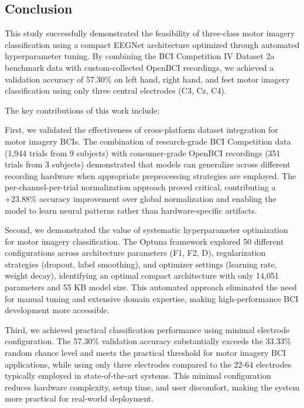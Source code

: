 \subsection{Conclusion}

This study successfully demonstrated the feasibility of three-class motor imagery classification using a compact EEGNet architecture optimized through automated hyperparameter tuning. By combining the BCI Competition IV Dataset 2a benchmark data with custom-collected OpenBCI recordings, we achieved a validation accuracy of 57.30\% on left hand, right hand, and feet motor imagery classification using only three central electrodes (C3, Cz, C4).

The key contributions of this work include:

First, we validated the effectiveness of cross-platform dataset integration for motor imagery BCIs. The combination of research-grade BCI Competition data (1,944 trials from 9 subjects) with consumer-grade OpenBCI recordings (351 trials from 3 subjects) demonstrated that models can generalize across different recording hardware when appropriate preprocessing strategies are employed. The per-channel-per-trial normalization approach proved critical, contributing a +23.88\% accuracy improvement over global normalization and enabling the model to learn neural patterns rather than hardware-specific artifacts.

Second, we demonstrated the value of systematic hyperparameter optimization for motor imagery classification. The Optuna framework explored 50 different configurations across architecture parameters (F1, F2, D), regularization strategies (dropout, label smoothing), and optimizer settings (learning rate, weight decay), identifying an optimal compact architecture with only 14,051 parameters and 55 KB model size. This automated approach eliminated the need for manual tuning and extensive domain expertise, making high-performance BCI development more accessible.

Third, we achieved practical classification performance using minimal electrode configuration. The 57.30\% validation accuracy substantially exceeds the 33.33\% random chance level and meets the practical threshold for motor imagery BCI applications, while using only three electrodes compared to the 22-64 electrodes typically employed in state-of-the-art systems. This minimal configuration reduces hardware complexity, setup time, and user discomfort, making the system more practical for real-world deployment.

